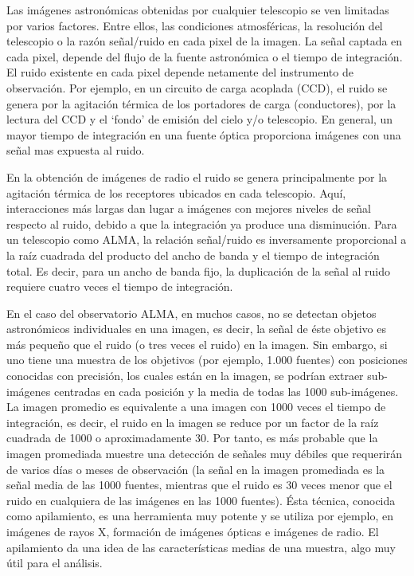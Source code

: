 Las imágenes astronómicas obtenidas por cualquier telescopio se ven
limitadas por varios factores. Entre ellos, las condiciones
atmosféricas, la resolución del telescopio o la razón señal/ruido en
cada pixel de la imagen. La señal captada en cada pixel, depende del
flujo de la fuente astronómica o el tiempo de integración. El ruido
existente en cada pixel depende netamente del instrumento de
observación. Por ejemplo, en un circuito de carga acoplada (CCD), el
ruido se genera por la agitación térmica de los portadores de carga
(conductores), por la lectura del CCD y el ‘fondo’ de emisión del
cielo y/o telescopio. En general, un mayor tiempo de integración en
una fuente óptica proporciona imágenes con una señal mas expuesta al
ruido.

En la obtención de imágenes de radio el ruido se genera principalmente
por la agitación térmica de los receptores ubicados en cada
telescopio. Aquí, interacciones más largas dan lugar a imágenes con
mejores niveles de señal respecto al ruido, debido a que la
integración ya produce una disminución. Para un telescopio como ALMA,
la relación señal/ruido es inversamente proporcional a la raíz
cuadrada del producto del ancho de banda y el tiempo de integración
total. Es decir, para un ancho de banda fijo, la duplicación de la
señal al ruido requiere cuatro veces el tiempo de integración.

En el caso del observatorio ALMA, en muchos casos, no se detectan
objetos astronómicos individuales en una imagen, es decir, la señal de
éste objetivo es más pequeño que el ruido (o tres veces el ruido) en
la imagen. Sin embargo, si uno tiene una muestra de los objetivos (por
ejemplo, 1.000 fuentes) con posiciones conocidas con precisión, los
cuales están en la imagen, se podrían extraer sub-imágenes centradas
en cada posición y la media de todas las 1000 sub-imágenes. La imagen
promedio es equivalente a una imagen con 1000 veces el tiempo de
integración, es decir, el ruido en la imagen se reduce por un factor
de la raíz cuadrada de 1000 o aproximadamente 30. Por tanto, es más
probable que la imagen promediada muestre una detección de señales muy
débiles que requerirán de varios días o meses de observación (la
señal en la imagen promediada es la señal media de las 1000 fuentes,
mientras que el ruido es 30 veces menor que el ruido en cualquiera de
las imágenes en las 1000 fuentes). Ésta técnica, conocida como
apilamiento, es una herramienta muy potente y se utiliza por ejemplo,
en imágenes de rayos X, formación de imágenes ópticas e imágenes de
radio. El apilamiento da una idea de las características medias de una
muestra, algo muy útil para el análisis.

